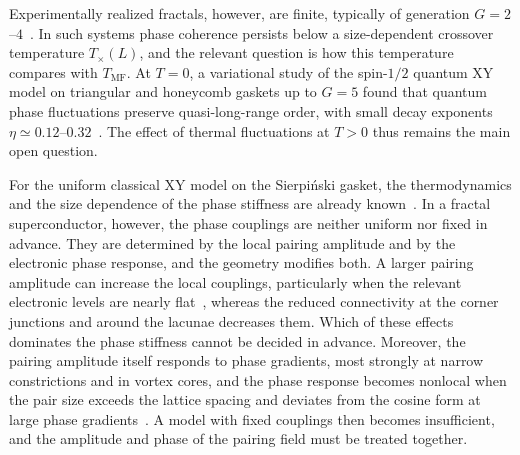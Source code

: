 \documentclass[aps,prb,twocolumn,superscriptaddress,floatfix]{revtex4-2}
\newcommand{\Tmf}{T_{\mathrm{MF}}}
\begin{document}
Experimentally realized fractals, however, are finite, typically of
generation $G = 2$--$4$~\cite{Kempkes2019,Shang2015,Gordon1986,Meyer1991,Meyer2002}.
In such systems phase coherence persists below a size-dependent crossover
temperature $T_\times(L)$, and the relevant question is how this temperature
compares with $\Tmf$. At $T = 0$, a variational study of the spin-$1/2$
quantum XY model on triangular and honeycomb gaskets up to $G = 5$ found that
quantum phase fluctuations preserve quasi-long-range order, with small decay
exponents $\eta \simeq 0.12$--$0.32$~\cite{Canyellas2026quantum}. The effect
of thermal fluctuations at $T > 0$ thus remains the main open question.

For the uniform classical XY model on the Sierpi\'nski gasket, the
thermodynamics and the size dependence of the phase stiffness are already
known~\cite{Vallat1991,MB10}. In a fractal superconductor, however, the phase
couplings are neither uniform nor fixed in advance. They are determined by the
local pairing amplitude and by the electronic phase response, and the geometry
modifies both. A larger pairing amplitude can increase the local couplings,
particularly when the relevant electronic levels are nearly
flat~\cite{PT15}, whereas the reduced connectivity at the corner
junctions and around the lacunae decreases them. Which of these effects
dominates the phase stiffness cannot be decided in advance. Moreover, the
pairing amplitude itself responds to phase gradients, most strongly at narrow
constrictions and in vortex cores, and the phase response becomes nonlocal
when the pair size exceeds the lattice spacing and deviates from the cosine
form at large phase gradients~\cite{GRT01,BTC04,MASD05,DMA07,EM10}. A model
with fixed couplings then becomes insufficient, and the amplitude and phase of
the pairing field must be treated together.
\end{document}

